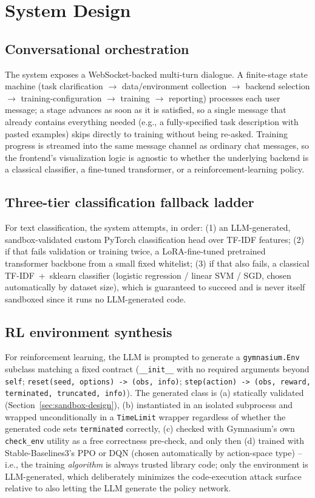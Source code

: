 \documentclass[10pt,twocolumn]{article}
\begin{document}
\section{System Design}

\subsection{Conversational orchestration}
The system exposes a WebSocket-backed multi-turn dialogue. A finite-stage
state machine (task clarification $\to$ data/environment collection $\to$
backend selection $\to$ training-configuration $\to$ training $\to$
reporting) processes each user message; a stage advances as soon as it is
satisfied, so a single message that already contains everything needed
(e.g., a fully-specified task description with pasted examples) skips
directly to training without being re-asked. Training progress is streamed
into the same message channel as ordinary chat messages, so the frontend's
visualization logic is agnostic to whether the underlying backend is a
classical classifier, a fine-tuned transformer, or a reinforcement-learning
policy.

\subsection{Three-tier classification fallback ladder}
For text classification, the system attempts, in order: (1) an
LLM-generated, sandbox-validated custom PyTorch classification head over
TF-IDF features; (2) if that fails validation or training twice, a
LoRA-fine-tuned pretrained transformer backbone from a small fixed
whitelist; (3) if that also fails, a classical TF-IDF~+~sklearn classifier
(logistic regression / linear SVM / SGD, chosen automatically by dataset
size), which is guaranteed to succeed and is never itself sandboxed since it
runs no LLM-generated code.

\subsection{RL environment synthesis}
For reinforcement learning, the LLM is prompted to generate a
\texttt{gymnasium.Env} subclass matching a fixed contract
(\texttt{\_\_init\_\_} with no required arguments beyond \texttt{self};
\texttt{reset(seed, options) -> (obs, info)}; \texttt{step(action) ->
(obs, reward, terminated, truncated, info)}). The generated class is (a)
statically validated (Section~\ref{sec:sandbox-design}), (b) instantiated in
an isolated subprocess and wrapped unconditionally in a
\texttt{TimeLimit} wrapper regardless of whether the generated code sets
\texttt{terminated} correctly, (c) checked with Gymnasium's own
\texttt{check\_env} utility as a free correctness pre-check, and only then
(d) trained with Stable-Baselines3's PPO or DQN (chosen automatically by
action-space type) -- i.e., the training \emph{algorithm} is always trusted
library code; only the environment is LLM-generated, which deliberately
minimizes the code-execution attack surface relative to also letting the
LLM generate the policy network.
\end{document}
